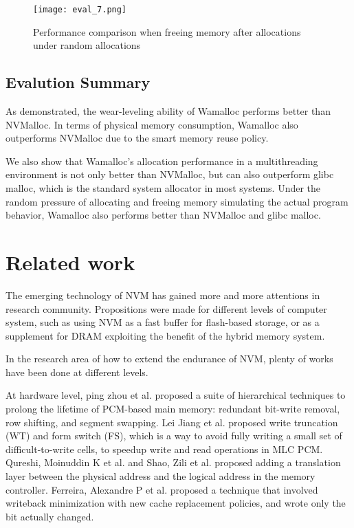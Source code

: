 \documentclass[10pt, conference, compsocconf]{IEEEtran}
\begin{document}
\begin{figure}[t]
\centering
\texttt{[image: eval\_7.png]}
\caption{Performance comparison when freeing memory after allocations under random allocations}
\label{fig:eval_7}
\end{figure}

\subsection{Evalution Summary}

As demonstrated, 
the wear-leveling ability of Wamalloc performs better than NVMalloc.
In terms of physical memory consumption, Wamalloc also outperforms NVMalloc
due to the smart memory reuse policy.

We also show that Wamalloc's allocation performance in a multithreading environment is not only better than NVMalloc,
but can also outperform glibc malloc, which is the standard system allocator in most systems.
Under the random pressure of allocating and freeing memory simulating the actual program behavior,
Wamalloc also performs better than NVMalloc and glibc malloc.

\section{Related work}

The emerging technology of NVM has gained more and more attentions in research community.
Propositions were made for different levels of computer system, 
such as using NVM as a fast buffer for flash-based storage\cite{greenan2007prims}, 
or as a supplement for DRAM exploiting the benefit of the hybrid memory system.

In the research area of how to extend the endurance of NVM,
plenty of works have been done at different levels.

At hardware level, ping zhou et al.\cite{zhou2009durable} proposed a suite of hierarchical techniques to
prolong the lifetime of PCM-based main memory: 
redundant bit-write removal, row shifting, and segment swapping.
Lei Jiang et al.\cite{jiang2012improving} proposed write truncation (WT) and form switch (FS),
which is a way to avoid fully writing a small set of difficult-to-write cells, to speedup write and read operations in MLC PCM.
Qureshi, Moinuddin K et al.\cite{qureshi2009enhancing} and Shao, Zili et al.\cite{shao2012ptl} proposed adding a translation layer
between the physical address and the logical address in the memory controller.
Ferreira, Alexandre P et al.\cite{ferreira2010increasing} proposed a technique that involved 
writeback minimization with new cache replacement policies, and wrote only the bit actually changed.
\end{document}
